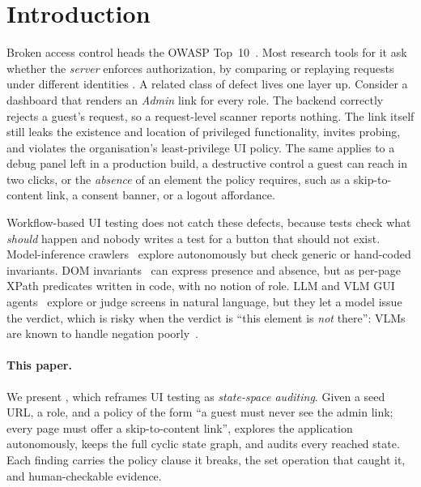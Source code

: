 \section{Introduction}
\label{sec:intro}

Broken access control heads the OWASP Top~10~\cite{owasp2021a01}. Most
research tools for it ask whether the \emph{server} enforces authorization,
by comparing or replaying requests under different identities
\cite{sun2011static,li2014blackbox,noseevich2011detecting,monshizadeh2014mace,liu2025bacscan}.
A related class of defect lives one layer up. Consider a dashboard that
renders an \emph{Admin} link for every role. The backend correctly rejects a
guest's request, so a request-level scanner reports nothing. The link itself
still leaks the existence and location of privileged functionality, invites
probing, and violates the organisation's least-privilege UI policy. The same
applies to a debug panel left in a production build, a destructive control a
guest can reach in two clicks, or the \emph{absence} of an element the policy
requires, such as a skip-to-content link, a consent banner, or a logout
affordance.

Workflow-based UI testing does not catch these defects, because tests check
what \emph{should} happen and nobody writes a test for a button that should
not exist. Model-inference crawlers~\cite{mesbah2012crawljax,memon2003ripping,dallmeier2013webmate}
explore autonomously but check generic or hand-coded invariants. DOM
invariants~\cite{mesbah2012invariant} can express presence and absence, but as
per-page XPath predicates written in code, with no notion of role. LLM and
VLM GUI agents~\cite{liu2024gptdroid,yoon2024droidagent,liu2024visiondroid,zheng2024seeact}
explore or judge screens in natural language, but they let a model issue the
verdict, which is risky when the verdict is ``this element is \emph{not}
there'': VLMs are known to handle negation poorly~\cite{alhamoud2025negation}.

\paragraph{This paper.}
We present \sys{}, which reframes UI testing as \emph{state-space auditing}.
Given a seed URL, a role, and a policy of the form ``a guest must never see the
admin link; every page must offer a skip-to-content link'', \sys{} explores the
application autonomously, keeps the full cyclic state graph, and audits every
reached state. Each finding carries the policy clause it breaks, the set
operation that caught it, and human-checkable evidence.

